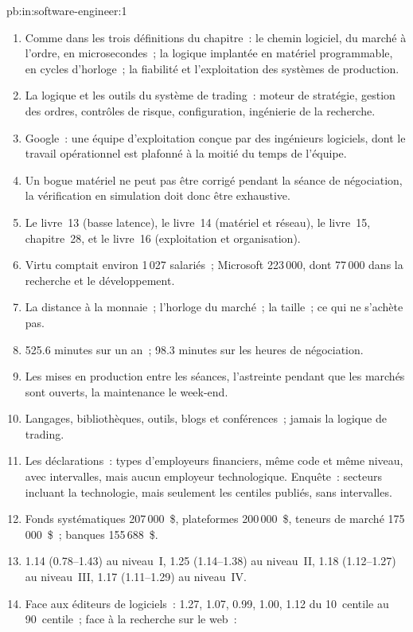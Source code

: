 \begin{solution}{pb:in:software-engineer:1}
\begin{enumerate}
\item Comme dans les trois définitions du chapitre~: le chemin logiciel, du marché à l'ordre, en microsecondes~; la logique
implantée en matériel programmable, en cycles d'horloge~; la fiabilité et l'exploitation des systèmes de production.
\item La logique et les outils du système de trading~: moteur de stratégie, gestion des ordres, contrôles de risque, configuration, ingénierie
de la recherche.
\item Google~: une équipe d'exploitation conçue par des ingénieurs logiciels, dont le travail opérationnel est plafonné à la moitié du temps de l'équipe.
\item Un bogue matériel ne peut pas être corrigé pendant la séance de négociation, la vérification en simulation doit donc être exhaustive.
\item Le livre~13 (basse latence), le livre~14 (matériel et réseau), le livre~15, chapitre~28, et le livre~16 (exploitation et
organisation).
\item Virtu comptait environ 1\,027 salariés~; Microsoft 223\,000, dont 77\,000 dans la recherche et le développement.
\item La distance à la monnaie~; l'horloge du marché~; la taille~; ce qui ne s'achète pas.
\item 525.6 minutes sur un an~; 98.3 minutes sur les heures de négociation.
\item Les mises en production entre les séances, l'astreinte pendant que les marchés sont ouverts, la maintenance le week-end.
\item Langages, bibliothèques, outils, blogs et conférences~; jamais la logique de trading.
\item Les déclarations~: types d'employeurs financiers, même code et même niveau, avec intervalles, mais aucun employeur technologique. Enquête~:
secteurs incluant la technologie, mais seulement les centiles publiés, sans intervalles.
\item Fonds systématiques 207\,000~\$, plateformes 200\,000~\$, teneurs de marché 175\,000~\$~; banques 155\,688~\$.
\item 1.14 (0.78--1.43) au niveau~I, 1.25 (1.14--1.38) au niveau~II, 1.18 (1.12--1.27) au niveau~III, 1.17 (1.11--1.29) au niveau~IV.
\item Face aux éditeurs de logiciels~: 1.27, 1.07, 0.99, 1.00, 1.12 du 10~centile au 90~centile~; face à la recherche sur le web~:

\end{enumerate}
\end{solution}
